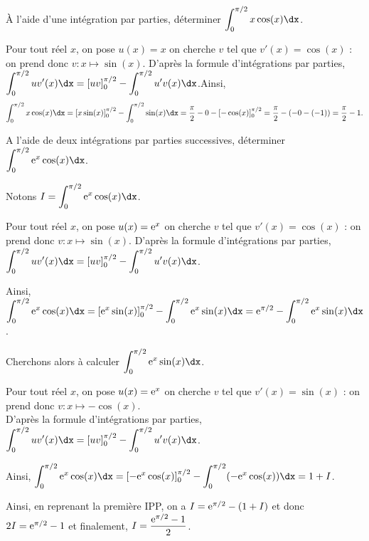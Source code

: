 \documentclass[11pt,fleqn, openany]{book} %
\begin{document}
\begin{exercise}[topic=trig02]À l'aide d'une intégration par parties, déterminer $\displaystyle \int _{0}^{\pi /2} x\cos (x) \dx$.\end{exercise}

\begin{solution}Pour tout réel $x$, on pose $u(x)=x$ on cherche $v$ tel que $v'(x)=\cos(x)$ : on prend donc $v:x\mapsto \sin(x)$. D'après la formule d'intégrations par parties, $\displaystyle \int _{0}^{\pi /2} uv' (x) \dx = [uv]_0^{\pi/2}-\displaystyle \int _{0}^{\pi /2} u'v(x) \dx$.Ainsi, 
\[\displaystyle \int _{0}^{\pi /2} x\cos (x) \dx = [x\sin(x)]_0^{\pi/2}-\displaystyle \int _{0}^{\pi /2}\sin(x)\dx=\dfrac{\pi}{2}-0-[-\cos(x)]_0^{\pi/2}=\dfrac{\pi}{2}-(-0-(-1))=\dfrac{\pi}{2}-1.\]
\end{solution}



\begin{exercise}[topic=trig02]A l'aide de deux intégrations par parties successives, déterminer $\displaystyle \int _{0}^{\pi /2} \e^x\cos (x) \dx$.\newpage \end{exercise}

\begin{solution}Notons $I=\displaystyle \int _{0}^{\pi /2} \e^x\cos (x) \dx$.

Pour tout réel $x$, on pose $u(x)=\mathrm{e}^x$ on cherche $v$ tel que $v'(x)=\cos(x)$ : on prend donc $v:x\mapsto \sin(x)$. D'après la formule d'intégrations par parties, $\displaystyle \int _{0}^{\pi /2} uv' (x) \dx = [uv]_0^{\pi/2}-\displaystyle \int _{0}^{\pi /2} u'v(x) \dx$.

Ainsi, $\displaystyle \int _{0}^{\pi /2} \e^x\cos (x) \dx = [\e^x\sin(x)]_0^{\pi/2}-\displaystyle \int _{0}^{\pi /2}\e^x\sin(x)\dx=\e^{\pi/2}-\displaystyle \int _{0}^{\pi /2}\e^x\sin(x)\dx$.

Cherchons alors à calculer $\displaystyle \int _{0}^{\pi /2}\e^x\sin(x)\dx$. 

Pour tout réel $x$, on pose $u(x)=\mathrm{e}^x$ on cherche $v$ tel que $v'(x)=\sin(x)$ : on prend donc $v:x\mapsto -\cos(x)$. \\ D'après la formule d'intégrations par parties, $\displaystyle \int _{0}^{\pi /2} uv' (x) \dx = [uv]_0^{\pi/2}-\displaystyle \int _{0}^{\pi /2} u'v(x) \dx$.

Ainsi, $\displaystyle \int _{0}^{\pi /2} \e^x\cos (x) \dx = [-\e^x\cos(x)]_0^{\pi/2}-\displaystyle \int _{0}^{\pi /2}(-\e^x\cos(x))\dx=1+I$.

Ainsi, en reprenant la première IPP, on a $I=\mathrm{e}^{\pi/2}-(1+I)$ et donc $2I=\mathrm{e}^{\pi/2}-1$ et finalement, $I=\dfrac{\mathrm{e}^{\pi/2}-1}{2}$.\end{solution}
\end{document}
